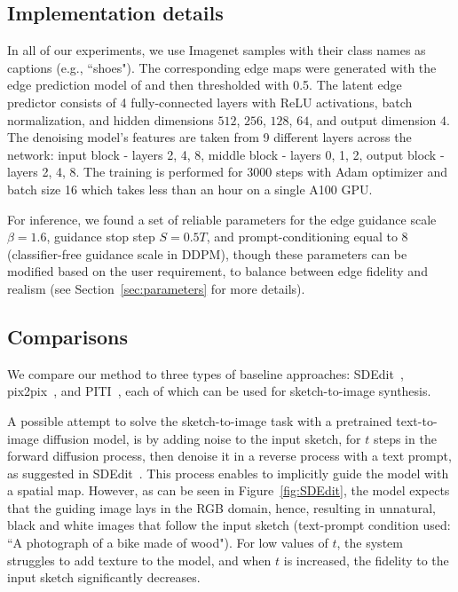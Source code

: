 \subsection{Implementation details} In all of our experiments, we use Imagenet  \cite{deng2009imagenet} samples with their class names as captions (e.g., ``shoes"). The corresponding edge maps were generated with the edge prediction model of \cite{su2021pixel} and then thresholded with 0.5. The latent edge predictor consists of 4 fully-connected layers with ReLU activations, batch normalization, and hidden dimensions $512$, $256$, $128$, $64$, and output dimension $4$. The denoising model's features are taken from 9 different layers across the network: input block - layers 2, 4, 8, middle block - layers 0, 1, 2, output block - layers 2, 4, 8. The training is performed for 3000 steps with Adam optimizer and batch size 16 which takes less than an hour on a single A100 GPU.

For inference, we found a set of reliable parameters for the edge guidance scale $\beta = 1.6$, guidance stop step $S = 0.5T$, and prompt-conditioning equal to $8$ (classifier-free guidance scale in DDPM), though these parameters can be modified based on the user requirement, to balance between edge fidelity and realism (see Section~\ref{sec:parameters} for more details).

\subsection{Comparisons}
We compare our method to three types of baseline approaches: SDEdit~\cite{meng2021sdedit}, pix2pix~\cite{isola2017image}, and PITI~\cite{PITI22}, each of which can be used for sketch-to-image synthesis.

A possible attempt to solve the sketch-to-image task with a pretrained text-to-image diffusion model, is by adding noise to the input sketch, for $t$ steps in the forward diffusion process, then denoise it in a reverse process with a text prompt, as suggested in  SDEdit~\cite{meng2021sdedit}. This process enables to implicitly guide the model with a spatial map. However, as can be seen in Figure~\ref{fig:SDEdit}, the model expects that the guiding image lays in the RGB domain, hence, resulting in unnatural, black and white images that follow the input sketch (text-prompt condition used: ``A photograph of a bike made of wood"). For low values of $t$, the system struggles to add texture to the model, and when $t$ is increased, the fidelity to the input sketch significantly decreases.

